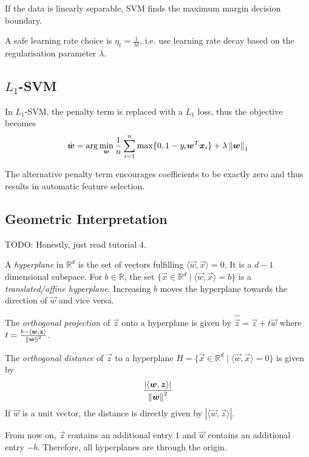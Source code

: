If the data is linearly separable, SVM finds the
maximum margin decision boundary.

A safe learning rate choice is $\eta_t = \frac{1}{\lambda t}$, i.e. use learning rate decay
based on the regularisation parameter $\lambda$.


\subsection{$L_1$-SVM}
In $L_1$-SVM, the penalty term is replaced with a $L_1$ loss,
thus the objective becomes
\begin{equation*}
    \hat{\boldsymbol{w}} = \arg\min_{\boldsymbol{w}} \frac{1}{n}
    \sum_{i=1}^n \max\{0, 1 - y_i \boldsymbol{w}^T \boldsymbol{x}_i\}
    + \lambda \left\lVert\boldsymbol{w}\right\rVert_1
\end{equation*}

The alternative penalty term encourages coefficients to be
exactly zero and thus results in automatic feature selection.


\subsection{Geometric Interpretation}
TODO: Honestly, just read tutorial 4.

A \emph{hyperplane} in $\mathbb{R}^d$ is the
set of vectors fulfilling
$\langle \vec{w}, \vec{x} \rangle = 0$.
It is a $d-1$ dimensional subspace.
For $b \in \mathbb{R}$, the set
$\{\vec{x} \in \mathbb{R}^d \mid \langle \vec{w}, \vec{x} \rangle = b\}$
is a \emph{translated/affine hyperplane}.
Increasing $b$ moves the hyperplane towards
the direction of $\vec{w}$ and vice versa.

The \emph{orthogonal projection} of $\vec{z}$
onto a hyperplane is given by $\hat{\vec{z}} = \vec{z} + t \vec{w}$
where $t = \frac{b - \langle \boldsymbol{w}, \boldsymbol{z} \rangle}{\left\lVert\boldsymbol{w}\right\rVert^2}$.

The \emph{orthogonal distance} of $\vec{z}$ to a
hyperplane $H = \{\vec{x} \in \mathbb{R}^d \mid \langle \vec{w}, \vec{x} \rangle = 0\}$
is given by
\begin{equation*}
    \frac{| \langle \boldsymbol{w}, \boldsymbol{z} \rangle |}{\left\lVert\boldsymbol{w}\right\rVert^2}
\end{equation*}
If $\vec{w}$ is a unit vector, the distance is directly
given by $|\langle \vec{w}, \vec{z} \rangle|$.

From now on, $\vec{z}$ contains an additional entry
$1$ and $\vec{w}$ contains an additional entry $-b$.
Therefore, all hyperplanes are through the origin.

